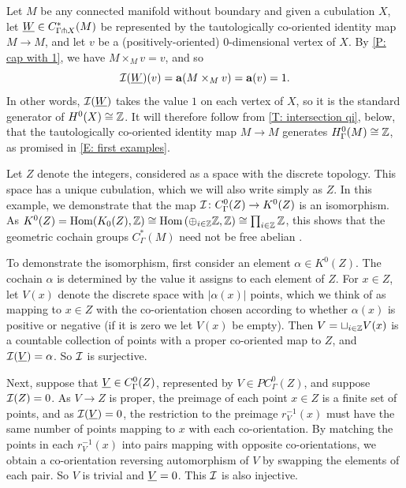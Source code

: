 \begin{example}\label{E: coho 0 generator}
	Let $M$ be any connected manifold without boundary and given a cubulation $X$, let $\underline{W} \in C^*_{\Gamma \pitchfork X}(M)$ be represented by the tautologically co-oriented identity map $M \to M$, and let $v$ be a (positively-oriented) $0$-dimensional vertex of $X$.
	By \cref{P: cap with 1}, we have $M \times_M v = v$, and so
	\[\mathcal{I}(\underline{W})(v) = \mathbf{a}(M \times_M v) = \mathbf{a}(v) = 1.\]
	In other words, $\mathcal{I}(\underline{W})$ takes the value $1$ on each vertex of $X$, so it is the standard generator of $H^0(X) \cong \mathbb{Z}$.
	It will therefore follow from \cref{T: intersection qi}, below, that the tautologically co-oriented identity map $M \to M$ generates $H^0_\Gamma(M) \cong \mathbb{Z}$, as promised in \cref{E: first examples}.
\end{example}

\begin{example}\label{E: uncountable}
	Let $Z$ denote the integers, considered as a space with the discrete topology.
	This space has a unique cubulation, which we will also write simply as $Z$.
	In this example, we demonstrate that the map $\mathcal{I} \colon C^0_\Gamma(Z) \to K^0(Z)$ is an isomorphism.
	As $K^0(Z) = \textup{Hom}(K_0(Z),\mathbb{Z}) \cong \textup{Hom}\left(\displaystyle\oplus_{i \in \mathbb{Z}} \mathbb{Z}, \mathbb{Z}\right) \cong \prod_{i\in \mathbb{Z}} \mathbb{Z}$, this shows that the geometric cochain groups $C^*_\Gamma(M)$ need not be free abelian \cite{Sch08}.

	To demonstrate the isomorphism, first consider an element $\alpha \in K^0(Z)$.
	The cochain $\alpha$ is determined by the value it assigns to each element of $Z$.
	For $x \in Z$, let $V(x)$ denote the discrete space with $|\alpha(x)|$ points, which we think of as mapping to $x \in Z$ with the co-orientation chosen according to whether $\alpha(x)$ is positive or negative (if it is zero we let $V(x)$ be empty).
	Then $V = \displaystyle\sqcup_{i \in \mathbb{Z}} V(x)$ is a countable collection of points with a proper co-oriented map to $Z$, and $\mathcal{I}(\underline{V}) = \alpha$.
	So $\mathcal{I}$ is surjective.

	Next, suppose that $\underline{V} \in C^0_\Gamma(Z)$, represented by $V \in PC^0_\Gamma(Z)$, and suppose $\mathcal{I}(Z) = 0$.
	As $V \to Z$ is proper, the preimage of each point $x \in Z$ is a finite set of points, and as $\mathcal{I}(\underline{V}) = 0$, the restriction to the preimage $r_V^{-1}(x)$ must have the same number of points mapping to $x$ with each co-orientation.
	By matching the points in each $r_V^{-1}(x)$ into pairs mapping with opposite co-orientations, we obtain a co-orientation reversing automorphism of $V$ by swapping the elements of each pair.
	So $V$ is trivial and $\underline{V} = 0$.
	This $\mathcal{I}$ is also injective.
\end{example}

